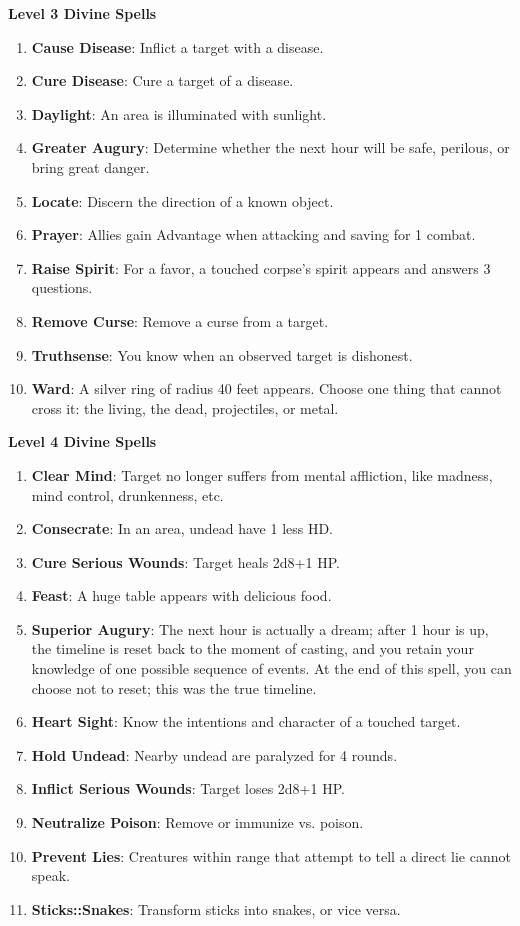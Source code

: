 \documentclass[twoside]{article}
\begin{document}
\textbf{Level 3 Divine Spells}
\begin{enumerate}[nosep]
\item \textbf{Cause Disease}: Inflict a target with a disease.
\item \textbf{Cure Disease}: Cure a target of a disease.
\item \textbf{Daylight}: An area is illuminated with sunlight.
\item \textbf{Greater Augury}: Determine whether the next hour will be safe, perilous, or bring great danger.
\item \textbf{Locate}: Discern the direction of a known object.
\item \textbf{Prayer}: Allies gain Advantage when attacking and saving for 1 combat.
\item \textbf{Raise Spirit}: For a favor, a touched corpse's spirit appears and answers 3 questions.
\item \textbf{Remove Curse}: Remove a curse from a target.
\item \textbf{Truthsense}: You know when an observed target is dishonest.
\item \textbf{Ward}: A silver ring of radius 40 feet appears. Choose one thing that cannot cross it: the living, the dead, projectiles, or metal.
\end{enumerate}

\textbf{Level 4 Divine Spells}
\begin{enumerate}[nosep]
\item \textbf{Clear Mind}: Target no longer suffers from mental affliction, like madness, mind control, drunkenness, etc. 
\item \textbf{Consecrate}: In an area, undead have 1 less HD.
\item \textbf{Cure Serious Wounds}: Target heals 2d8+1 HP.
\item \textbf{Feast}: A huge table appears with delicious food.
\item \textbf{Superior Augury}: The next hour is actually a dream; after 1 hour is up, the timeline is reset back to the moment of casting, and you retain your knowledge of one possible sequence of events. At the end of this spell, you can choose not to reset; this was the true timeline.
\item \textbf{Heart Sight}: Know the intentions and character of a touched target.
\item \textbf{Hold Undead}: Nearby undead are paralyzed for 4 rounds.
\item \textbf{Inflict Serious Wounds}: Target loses 2d8+1 HP.
\item \textbf{Neutralize Poison}: Remove or immunize vs. poison.
\item \textbf{Prevent Lies}: Creatures within range that attempt to tell a direct lie cannot speak.
\item \textbf{Sticks::Snakes}: Transform sticks into snakes, or vice versa.
\end{enumerate}
\end{document}
